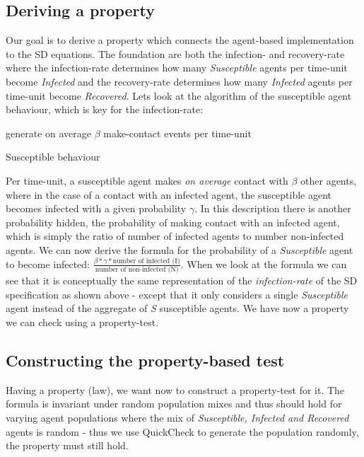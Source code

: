 \subsection{Deriving a property}
Our goal is to derive a property which connects the agent-based implementation to the SD equations. The foundation are both the infection- and recovery-rate where the infection-rate determines how many \textit{Susceptible} agents per time-unit become \textit{Infected} and the recovery-rate determines how many \textit{Infected} agents per time-unit become \textit{Recovered}. Lets look at the algorithm of the susceptible agent behaviour, which is key for the infection-rate:

\begin{algorithm}
generate on average $\beta$ make-contact events per time-unit\; 
\caption{Susceptible behaviour}
\end{algorithm}

Per time-unit, a susceptible agent makes \textit{on average} contact with $\beta$ other agents, where in the case of a contact with an infected agent, the susceptible agent becomes infected with a given probability $\gamma$. In this description there is another probability hidden, the probability of making contact with an infected agent, which is simply the ratio of number of infected agents to number non-infected agents. We can now derive the formula for the probability of a \textit{Susceptible} agent to become infected: $\frac{\beta * \gamma * \text{number of infected (I)}}{\text{number of non-infected (N)}}$. When we look at the formula we can see that it is conceptually the same representation of the \textit{infection-rate} of the SD specification as shown above - except that it only considers a single \textit{Susceptible} agent instead of the aggregate of \textit{S} susceptible agents. We have now a property we can check using a property-test.

\subsection{Constructing the property-based test}
Having a property (law), we want now to construct a property-test for it. The formula is invariant under random population mixes and thus should hold for varying agent populations where the mix of \textit{Susceptible, Infected and Recovered} agents is random - thus we use QuickCheck to generate the population randomly, the property must still hold.

